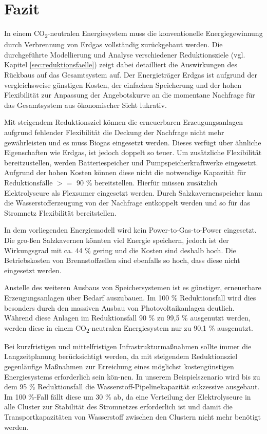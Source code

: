 \section{Fazit}
In einem CO\textsubscript{2}-neutralen Energiesystem muss die konventionelle Energiegewinnung durch Verbrennung von Erdgas vollständig zurückgebaut werden. Die durchgeführte Modellierung und Analyse verschiedener Reduktionsziele (vgl. Kapitel \ref{sec:reduktionsfaelle}) zeigt dabei detailliert die Auswirkungen des Rückbaus auf das Gesamtsystem auf.
Der Energieträger Erdgas ist aufgrund der vergleichsweise günstigen Kosten, der einfachen Speicherung und der hohen Flexibilität zur Anpassung der Angebotskurve an die momentane Nachfrage für das Gesamtsystem aus ökonomischer Sicht lukrativ. 

Mit steigendem Reduktionsziel können die erneuerbaren Erzeugungsanlagen aufgrund fehlender Flexibilität die Deckung der Nachfrage nicht mehr gewährleisten und es muss Biogas eingesetzt werden. Dieses verfügt über ähnliche Eigenschaften wie Erdgas, ist jedoch doppelt so teuer. Um zusätzliche Flexibilität bereitzustellen, werden Batteriespeicher und Pumpspeicherkraftwerke eingesetzt. Aufgrund der hohen Kosten können diese nicht die notwendige Kapazität für Reduktionsfälle $>=$ 90 \% bereitstellen.
Hierfür müssen zusätzlich Elektrolyseure als Flexsumer eingesetzt werden. Durch Salzkavernenspeicher kann die Wasserstofferzeugung von der Nachfrage entkoppelt werden und so für das Stromnetz Flex\-ibilität bereitstellen.  

In dem vorliegenden Energiemodell wird kein Power-to-Gas-to-Power eingesetzt. Die gro-ßen Salzkavernen könnten viel Energie speichern, jedoch ist der Wirkungsgrad mit ca. 44 \% gering und die Kosten sind deshalb hoch. Die Betriebskosten von Brennstoffzellen sind ebenfalls so hoch, dass diese nicht eingesetzt werden. 

Anstelle des weiteren Ausbaus von Speichersystemen ist es günstiger, erneuerbare Erzeugungsanlagen über Bedarf auszubauen. Im 100 \% Reduktionsfall wird dies besonders durch den massiven Ausbau von Photovoltaikanlagen deutlich. Während diese Anlagen im Reduktionsfall 90 \% zu 99,5 \% ausgenutzt werden, werden diese in einem CO\textsubscript{2}-neutralen Energiesystem nur zu 90,1 \% ausgenutzt.  

Bei kurzfristigen und mittelfristigen Infrastrukturmaßnahmen sollte immer die Langzeitplanung berücksichtigt werden, da mit steigendem Reduktionsziel gegenläufige Maßnahmen zur Erreichung eines möglichst kostengünstigen Energiesystems erforderlich sein kön-nen. In unserem Beispielszenario wird bis zu dem 95 \% Reduktionsfall die Wasserstoff-Pipeline\-kapazität sukzessive ausgebaut. Im 100 \%-Fall fällt diese um 30 \% ab, da eine Verteilung der Elektrolyseure in alle Cluster zur Stabilität des Stromnetzes erforderlich ist und damit die Transportkapazitäten von Wasserstoff zwischen den Clustern nicht mehr benötigt werden.

